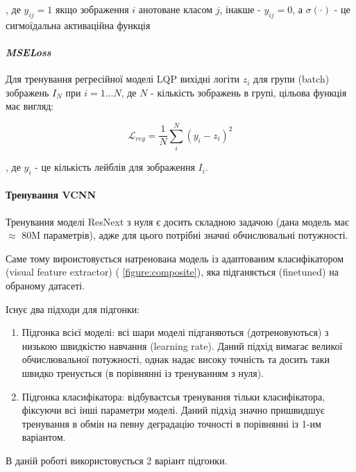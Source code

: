 \documentclass{udstu}
\begin{document}
, де $y_{ij} = 1$ якщо зображення $i$ анотоване класом $j$, інакше - $y_{ij} = 0$,
а $\sigma(\cdot)$ - це сигмоїдальна активаційна функція

\paragraph{\textit{MSELoss}\\}

Для тренування регресійної моделі LQP вихідні логіти $z_i$
для групи (batch) зображень $I_N$ при $i = 1...N$,
де $N$ - кількість зображень в групі,
цільова функція має вигляд:

\begin{equation}
\mathcal{L}_{reg} = \frac{1}{N} \sum_{i}^{N}
(y_i - z_i)^2
\end{equation}

, де $y_i$ - це кількість лейблів для зображення $I_i$.


\paragraph{\textbf{Тренування VCNN}\\}

Тренування моделі ResNext \cite{resnext} з нуля є досить складною задачою (дана модель має $\approx$ 80M параметрів),
адже для цього потрібні значні обчислювальні потужності.

Саме тому вироистовується натренована модель із адаптованим класифікатором (visual feature extractor) (\figurename{ \ref{figure:composite}}), яка підганяється (finetuned) на обраному датасеті.

Існує два підходи для підгонки:

\begin{enumerate}[1)]
	\item Підгонка всієї моделі:
	всі шари моделі підганяються (дотреновуються) з низькою швидкістю навчання (learning rate).
	Даний підхід вимагає великої обчислювальної потужності, однак надає високу точність та
	досить таки швидко тренується (в порівнянні із тренуванням з нуля).

	\item Підгонка класифікатора:
	відбуваєтсья тренування тільки класифікатора, фіксуючи всі інші параметри моделі.
	Даний підхід значно пришвидшує тренування в обмін на певну деградацію точності в порівнянні із 1-им варіантом.
\end{enumerate}

В даній роботі використовується 2 варіант підгонки.
\end{document}
